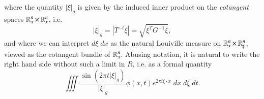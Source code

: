 %
where the quantity $|\xi|_g$ is given by the induced inner product on the \emph{cotangent} spaces $\operatorname{\mathbb{R}}^n_x \times \operatorname{\mathbb{R}}^n_x$, i.e.
%
\[ |\xi|_g = |T^{-t} \xi| = \sqrt{\xi^T G^{-1} \xi}, \]
%
and where we can interpret $d\xi\; dx$ as the natural Louiville measure on $\operatorname{\mathbb{R}}^n_x \times \operatorname{\mathbb{R}}^n_\xi$, viewed as the cotangent bundle of $\operatorname{\mathbb{R}}^n_x$. Abusing notation, it is natural to write the right hand side without such a limit in $R$, i.e. as a formal quantity
%
\[ \iiint \frac{\sin(2 \pi t |\xi|_g)}{|\xi|_g} \phi(x,t) e^{2 \pi i \xi \cdot x}\; dx\; d\xi\; dt. \]
%
%
%
%
%
%
%
%
%
%
%
%

